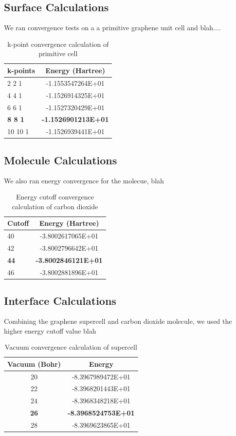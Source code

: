 \documentclass[journal=jacsat,manuscript=article]{achemso}
\begin{document}
\subsection{Surface Calculations}

We ran convergence tests on a a primitive graphene unit cell and  blah....

\begin{table}[hpt]
\caption{k-point convergence calculation of primitive cell}
\begin{tabular}{l c}
k-points&Energy (Hartree)\\
\hline
\hline
2 2 1&-1.1553547264E+01\\
4 4 1&-1.1526914325E+01\\
6 6 1&-1.1527320429E+01\\
\textbf{8 8 1}&\textbf{-1.1526901213E+01}\\
10 10 1&-1.1526939441E+01\\
\end{tabular}
\label{kpt1}
\end{table}


\subsection{Molecule Calculations}

We also ran energy convergence for the molecue, blah

\begin{table}[hpt]
\caption{Energy cutoff convergence calculation of carbon dioxide}
\begin{tabular}{l c}
Cutoff&Energy (Hartree)\\
\hline
\hline
40&-3.8002617065E+01\\
42&-3.8002796642E+01\\
\textbf{44}&\textbf{-3.8002846121E+01}\\
46&-3.8002881896E+01\\
\end{tabular}
\label{ecut}
\end{table}

\subsection{Interface Calculations}

Combining the graphene supercell and carbon dioxide molecule, we used the higher energy cutoff value blah

\begin{table}[hpt]
\caption{Vacuum convergence calculation of supercell}
\begin{tabular}{c c}
Vacuum (Bohr)&Energy\\
\hline
\hline
20&-8.3967989472E+01\\
22&-8.3968201443E+01\\
24&-8.3968348218E+01\\
\textbf{26}&\textbf{-8.3968524753E+01}\\
28&-8.3969623865E+01\\
\end{tabular}
\label{vacuum}
\end{table}
\end{document}
